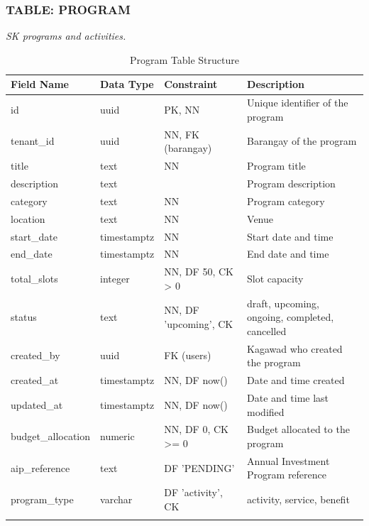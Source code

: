 \subsubsection*{TABLE: PROGRAM}
\noindent\textit{SK programs and activities.}
\begin{longtable}{|p{3.2cm}|p{2.2cm}|p{3.2cm}|p{5.4cm}|}
\hline
\textbf{Field Name} & \textbf{Data Type} & \textbf{Constraint} & \textbf{Description} \\ \hline
\endhead
\hline \endfoot
\hline \endlastfoot
id & uuid & PK, NN & Unique identifier of the program \\ \hline
tenant\_id & uuid & NN, FK (barangay) & Barangay of the program \\ \hline
title & text & NN & Program title \\ \hline
description & text & & Program description \\ \hline
category & text & NN & Program category \\ \hline
location & text & NN & Venue \\ \hline
start\_date & timestamptz & NN & Start date and time \\ \hline
end\_date & timestamptz & NN & End date and time \\ \hline
total\_slots & integer & NN, DF 50, CK > 0 & Slot capacity \\ \hline
status & text & NN, DF 'upcoming', CK & draft, upcoming, ongoing, completed, cancelled \\ \hline
created\_by & uuid & FK (users) & Kagawad who created the program \\ \hline
created\_at & timestamptz & NN, DF now() & Date and time created \\ \hline
updated\_at & timestamptz & NN, DF now() & Date and time last modified \\ \hline
budget\_allocation & numeric & NN, DF 0, CK >= 0 & Budget allocated to the program \\ \hline
aip\_reference & text & DF 'PENDING' & Annual Investment Program reference \\ \hline
program\_type & varchar & DF 'activity', CK & activity, service, benefit \\ \hline
\caption{Program Table Structure}
\label{tab:program}
\end{longtable}
\vspace{3mm}

